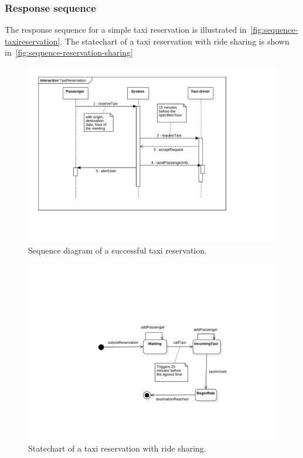 \subsubsection{Response sequence}
The response sequence for a simple taxi reservation is illustrated in~\autoref{fig:sequence-taxireservation}.
The statechart of a taxi reservation with ride sharing is shown in~\autoref{fig:sequence-reservation-sharing}
\begin{figure}
	\includegraphics[width=\textwidth]{diagrams/sequence_taxireservation.pdf}
	\caption{Sequence diagram of a successful taxi reservation.}
	\label{fig:sequence-taxireservation}
\end{figure}

\begin{figure}
	\includegraphics[width=\textwidth]{diagrams/statechart_reservation_shared.pdf}
	\caption{Statechart of a taxi reservation with ride sharing.}
	\label{fig:sequence-reservation-sharing}
\end{figure}


